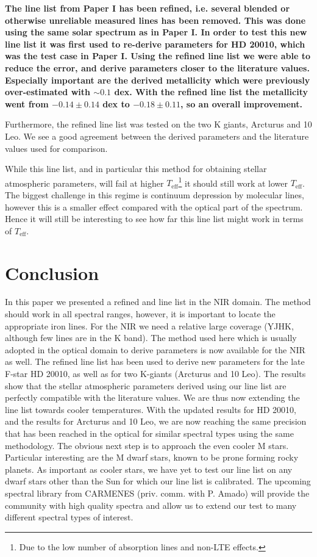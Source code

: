 \documentclass{aa}
\begin{document}
{\bf The line list from Paper I has been refined, i.e. several blended or
otherwise unreliable measured lines has been removed. This was done using the
same solar spectrum as in Paper I. In order to test this new line list it was
first used to re-derive parameters for HD 20010, which was the test case in
Paper I. Using the refined line list we were able to reduce the error, and
derive parameters closer to the literature values. Especially important are the
derived metallicity which were previously over-estimated with $\sim0.1$ dex.
With the refined line list the metallicity went from $-0.14\pm0.14$ dex to
$-0.18\pm0.11$, so an overall improvement.

Furthermore, the refined line list was tested on the two K giants, Arcturus and
10 Leo. We see a good agreement between the derived parameters and the
literature values used for comparison.

While this line list, and in particular this method for obtaining stellar
atmospheric parameters, will fail at higher $T_\mathrm{eff}$\footnote{Due to the
low number of absorption lines and non-LTE effects.} it should still work at
lower $T_\mathrm{eff}$. The biggest challenge in this regime is continuum
depression by molecular lines, however this is a smaller effect compared with
the optical part of the spectrum. Hence it will still be interesting to see how
far this line list might work in terms of $T_\mathrm{eff}$.}



\section{Conclusion}
\label{sec:conclusion}

In this paper we presented a refined  and  line list in
the NIR domain. The method should work in all spectral ranges, however, it is
important to locate the appropriate iron lines. For the NIR we need a relative
large coverage (YJHK, although few lines are in the K band). The method used
here which is usually adopted in the optical domain to derive parameters is now
available for the NIR as well. The refined line list has been used to derive new
parameters for the late F-star HD 20010, as well as for two K-giants (Arcturus
and 10 Leo). The results show that the stellar atmospheric parameters derived
using our line list are perfectly compatible with the literature values. We are
thus now extending the line list towards cooler temperatures. With the updated
results for HD 20010, and the results for Arcturus and 10 Leo, we are now
reaching the same precision that has been reached in the optical for similar
spectral types using the same methodology. The obvious next step is to approach
the even cooler M stars. Particular interesting are the M dwarf stars, known to
be prone forming rocky planets. As important as cooler stars, we have yet to
test our line list on any dwarf stars other than the Sun for which our line list
is calibrated. The upcoming spectral library from CARMENES (priv. comm. with P.
Amado) will provide the community with high quality spectra and allow us to
extend our test to many different spectral types of interest.
\end{document}
